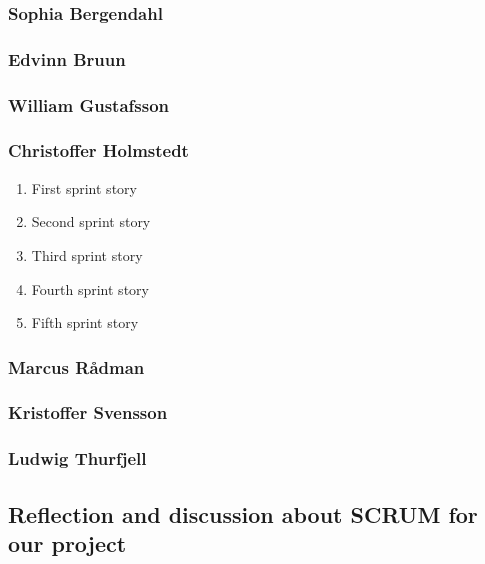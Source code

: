 \subsubsection{Sophia Bergendahl}
\subsubsection{Edvinn Bruun}
\subsubsection{William Gustafsson}
\subsubsection{Christoffer Holmstedt}
\begin{enumerate}
\item First sprint story
\item Second sprint story
\item Third sprint story
\item Fourth sprint story
\item Fifth sprint story
\end{enumerate}
\subsubsection{Marcus Rådman}
\subsubsection{Kristoffer Svensson}
\subsubsection{Ludwig Thurfjell}
\subsection{Reflection and discussion about SCRUM for our project}
